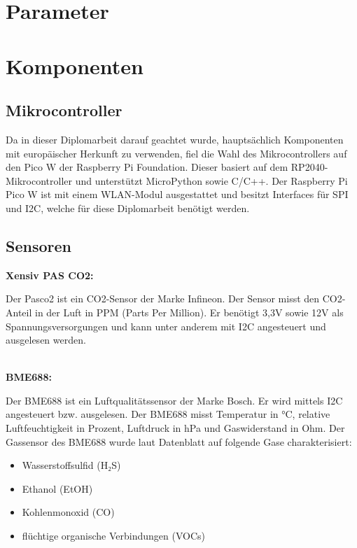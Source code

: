 \begin{inhalt}
\renewcommand*\chapterpagestyle{scrheadings}

\section{Parameter}

\section{Komponenten}

\subsection{Mikrocontroller}

Da in dieser Diplomarbeit darauf geachtet wurde, hauptsächlich Komponenten mit europäischer Herkunft zu verwenden, fiel die Wahl des Mikrocontrollers auf den Pico W der Raspberry Pi Foundation. Dieser basiert auf dem RP2040-Mikrocontroller und unterstützt MicroPython sowie C/C++. Der Raspberry Pi Pico W ist mit einem WLAN-Modul ausgestattet und besitzt Interfaces für SPI und I2C, welche für diese Diplomarbeit benötigt werden. \cite{Raspberry_Pi_Pico_W}

\subsection{Sensoren}

\textbf{Xensiv PAS CO2:}

\smallskip

Der Pasco2 ist ein CO2-Sensor der Marke Infineon. Der Sensor misst den CO2-Anteil in der Luft in PPM (Parts Per Million). Er benötigt 3,3V sowie 12V als Spannungsversorgungen und kann unter anderem mit I2C angesteuert und ausgelesen werden. \cite{PASCO2V01}

\bigskip \\

\textbf{BME688:}

\smallskip

Der BME688 ist ein Luftqualitätssensor der Marke Bosch. Er wird mittels I2C angesteuert bzw. ausgelesen. Der BME688 misst Temperatur in °C, relative Luftfeuchtigkeit in Prozent, Luftdruck in hPa und Gaswiderstand in Ohm. Der Gassensor des BME688 wurde laut Datenblatt auf folgende Gase charakterisiert:

\begin{itemize}
    \item Wasserstoffsulfid (H₂S) 
    \item Ethanol (EtOH) 
    \item Kohlenmonoxid (CO)
    \item flüchtige organische Verbindungen (VOCs)
\end{itemize}


\end{inhalt}
